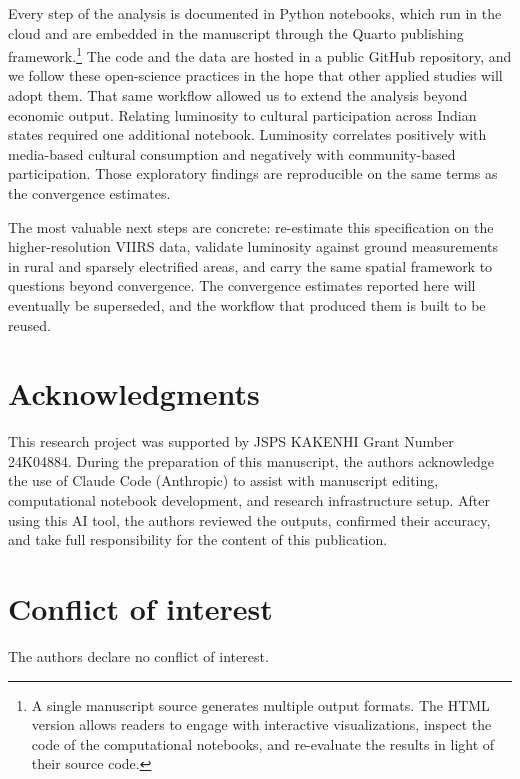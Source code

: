\documentclass[
  a4paper, 
  twoside,
  final
]{article}
\newcounter{code}
\begin{document}
Every step of the analysis is documented in Python notebooks, which run
in the cloud and are embedded in the manuscript through the Quarto
publishing framework.\footnote{A single manuscript source generates
  multiple output formats. The HTML version allows readers to engage
  with interactive visualizations, inspect the code of the computational
  notebooks, and re-evaluate the results in light of their source code.}
The code and the data are hosted in a public GitHub repository, and we
follow these open-science practices in the hope that other applied
studies will adopt them. That same workflow allowed us to extend the
analysis beyond economic output. Relating luminosity to cultural
participation across Indian states required one additional notebook.
Luminosity correlates positively with media-based cultural consumption
and negatively with community-based participation. Those exploratory
findings are reproducible on the same terms as the convergence
estimates.

The most valuable next steps are concrete: re-estimate this
specification on the higher-resolution VIIRS data, validate luminosity
against ground measurements in rural and sparsely electrified areas, and
carry the same spatial framework to questions beyond convergence. The
convergence estimates reported here will eventually be superseded, and
the workflow that produced them is built to be reused.

\section*{Acknowledgments}\label{acknowledgments}

This research project was supported by JSPS KAKENHI Grant Number
24K04884. During the preparation of this manuscript, the authors
acknowledge the use of Claude Code (Anthropic) to assist with manuscript
editing, computational notebook development, and research infrastructure
setup. After using this AI tool, the authors reviewed the outputs,
confirmed their accuracy, and take full responsibility for the content
of this publication.

\section*{Conflict of interest}\label{conflict-of-interest}

The authors declare no conflict of interest.
\end{document}
